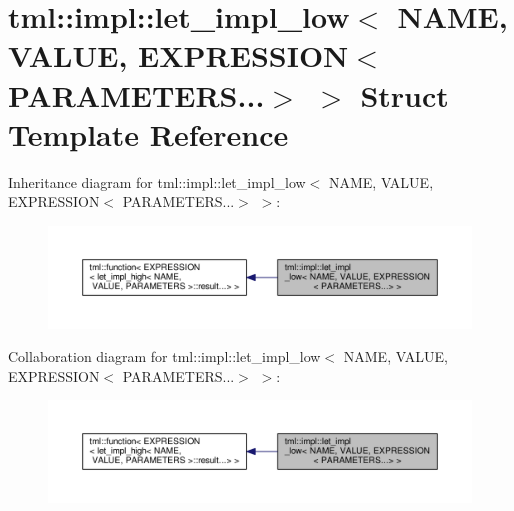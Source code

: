 \hypertarget{structtml_1_1impl_1_1let__impl__low_3_01_n_a_m_e_00_01_v_a_l_u_e_00_01_e_x_p_r_e_s_s_i_o_n_3_01_7754d217d819284c727f683f47631e24}{\section{tml\+:\+:impl\+:\+:let\+\_\+impl\+\_\+low$<$ N\+A\+M\+E, V\+A\+L\+U\+E, E\+X\+P\+R\+E\+S\+S\+I\+O\+N$<$ P\+A\+R\+A\+M\+E\+T\+E\+R\+S...$>$ $>$ Struct Template Reference}
\label{structtml_1_1impl_1_1let__impl__low_3_01_n_a_m_e_00_01_v_a_l_u_e_00_01_e_x_p_r_e_s_s_i_o_n_3_01_7754d217d819284c727f683f47631e24}
}


Inheritance diagram for tml\+:\+:impl\+:\+:let\+\_\+impl\+\_\+low$<$ N\+A\+M\+E, V\+A\+L\+U\+E, E\+X\+P\+R\+E\+S\+S\+I\+O\+N$<$ P\+A\+R\+A\+M\+E\+T\+E\+R\+S...$>$ $>$\+:
\nopagebreak
\begin{figure}[H]
\begin{center}
\leavevmode
\includegraphics[width=350pt]{structtml_1_1impl_1_1let__impl__low_3_01_n_a_m_e_00_01_v_a_l_u_e_00_01_e_x_p_r_e_s_s_i_o_n_3_01_3234a13dc4ac071d1388deb4086806b0}
\end{center}
\end{figure}


Collaboration diagram for tml\+:\+:impl\+:\+:let\+\_\+impl\+\_\+low$<$ N\+A\+M\+E, V\+A\+L\+U\+E, E\+X\+P\+R\+E\+S\+S\+I\+O\+N$<$ P\+A\+R\+A\+M\+E\+T\+E\+R\+S...$>$ $>$\+:
\nopagebreak
\begin{figure}[H]
\begin{center}
\leavevmode
\includegraphics[width=350pt]{structtml_1_1impl_1_1let__impl__low_3_01_n_a_m_e_00_01_v_a_l_u_e_00_01_e_x_p_r_e_s_s_i_o_n_3_01_8739e028c00ab5c93c507835c662e731}
\end{center}
\end{figure}
